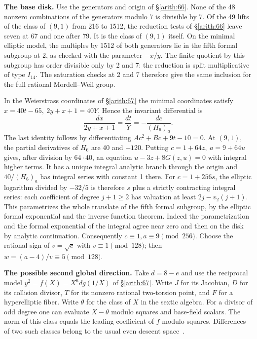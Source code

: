 \textbf{The base disk.} Use the generators and origin of \S\ref{arith:66}.
None of the 48 nonzero combinations of the generators modulo 7 is
divisible by 7. Of the 49 lifts of the class of \((9,1)\) from 216 to
1512, the reduction tests of \S\ref{arith:66} leave seven at 67 and one after 79.
It is the class of \((9,1)\) itself. On the minimal elliptic model,
the multiples by 1512 of both generators lie in the fifth formal
subgroup at 2, as checked with the parameter \(-x/y\).
The finite quotient by this subgroup has order divisible only by 2
and 7: the reduction is split multiplicative of type \(I_{14}\).
The saturation checks at 2 and 7 therefore give the same inclusion
for the full rational Mordell--Weil group.

In the Weierstrass coordinates of \S\ref{arith:67} the minimal coordinates satisfy
\(x=40t-65,\ 2y+x+1=40Y\). Hence the invariant differential is
\[\frac{dx}{2y+x+1}=\frac{dt}{Y}=-\frac{dc}{(H_6)_a}.\]
The last identity follows by differentiating \(A c^2+B c+9t-10=0\).
At \((9,1)\), the partial derivatives of \(H_6\) are 40 and \(-120\).
Putting \(c=1+64z,\ a=9+64u\) gives, after division by \(64\cdot40\),
an equation \(u-3z+8G(z,u)=0\) with integral higher terms.
It has a unique integral analytic branch through the origin and
\(40/(H_6)_a\) has integral series with constant 1 there. For
\(c=1+256s\), the elliptic logarithm divided by \(-32/5\) is therefore
\(s\) plus a strictly contracting integral series: each coefficient
of degree \(j+1\ge2\) has valuation at least \(2j-v_2(j+1)\).
This parametrizes the whole translate of the fifth formal subgroup,
by the elliptic formal exponential and the inverse function theorem.
Indeed the parametrization and the formal exponential of the integral
agree near zero and then on the disk by analytic continuation.
Consequently \(c\equiv1, a\equiv9\pmod{256}\). Choose the rational
sign of \(v=\sqrt c\) with \(v\equiv1\pmod{128}\); then
\(w=(a-4)/v\equiv5\pmod{128}\).

\textbf{The possible second global direction.} Take \(d=8-e\) and use the
reciprocal model \(y^2=f(X)=X^6 d g(1/X)\) of \S\ref{arith:67}. Write \(J\)
for its Jacobian, \(D\) for its collision divisor, \(T\) for its
nonzero rational two-torsion point, and \(F\) for a hyperelliptic
fiber. Write \(\theta\) for the class of \(X\) in the sextic algebra.
For a divisor of odd degree one can evaluate \(X-\theta\) modulo
squares and base-field scalars. The norm of this class equals the
leading coefficient of \(f\) modulo squares. Differences of two such
classes belong to the usual even descent space~\cite[\S\S5, 11--13]{PoonenSchaefer}.

